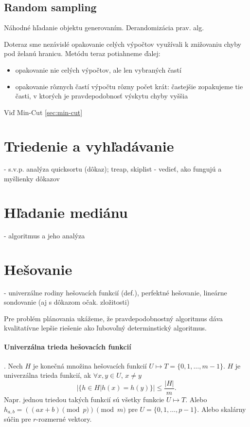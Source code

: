 \documentclass[12pt,a4paper]{article}
\begin{document}
\subsection{Random sampling} 
Náhodné hľadanie objektu generovaním. Derandomizácia prav. alg. 

Doteraz sme nezávislé opakovanie celých výpočtov využívali k znižovaniu chyby pod želanú hranicu. Metódu teraz potiahneme ďalej:
\begin{itemize} 
\item opakovanie nie celých výpočtov, ale len vybraných častí
\item opakovanie rôznych častí výpočtu rôzny počet krát: častejšie zopakujeme tie
časti, v ktorých je pravdepodobnosť výskytu chyby vyššia
\end{itemize} 
Viď Min-Cut \ref{sec:min-cut} 


\section{Triedenie a vyhľadávanie}
 - s.v.p. analýza quicksortu (dôkaz); treap, skiplist - vedieť, ako fungujú a myšlienky dôkazov
 

\section{Hľadanie mediánu}
 - algoritmus a jeho analýza
 

\section{Hešovanie}
 - univerzálne rodiny hešovacích funkcií (def.), perfektné hešovanie, lineárne sondovanie (aj s dôkazom očak. zložitosti)
 
Pre problém plánovania ukážeme, že pravdepodobnostný algoritmus dáva kvalitatívne lepšie riešenie ako ľubovoľný determinstický algoritmus.
 
\paragraph{Univerzálna trieda hešovacích funkcií}. Nech $H$ je konečná množina hešovacích funkcií $U \mapsto T = \{0,1,\ldots,m-1\}$. $H$ je univerzálna trieda funkcií, ak $\forall x,y \in U$, $x \neq y$ 
$$
  |\{h \in H | h(x) = h(y)\}| \leq \frac{|H|}{m}. 
$$
Napr. jednou triedou takých funkcií sú všetky funkcie $U \mapsto T$. Alebo $h_{a,b} = ((ax + b) \pmod p) \pmod m$ pre $U = \{0, 1, \ldots, p-1\}$. Alebo skalárny súčin pre $r$-rozmerné vektory. 
\end{document}
